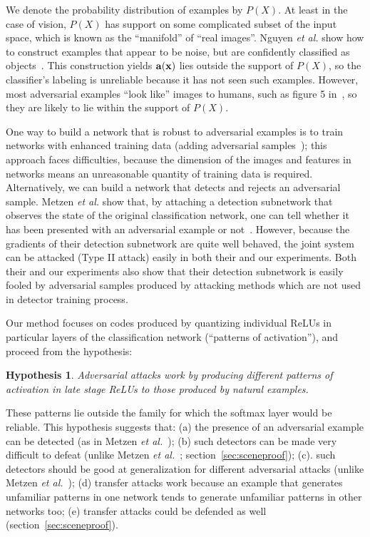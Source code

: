 \documentclass[10pt,twocolumn,letterpaper]{article}
\newtheorem{theorem}{Hypothesis}
\newcommand{\vect}[1]{{\bf {#1}}}
\begin{document}
We denote the probability distribution of examples by $P(X)$.  At least in the case of vision, $P(X)$ has support on
some complicated subset of the input space, which is known as 
the ``manifold'' of ``real images''.  Nguyen {\em et al.} show how to construct examples that appear to be noise, but
are confidently classified as objects~\cite{nguyenfooled}.  This construction yields $\vect{a}(\vect{x})$ lies outside
the support of $P(X)$, so the classifier's labeling is unreliable because it  has not  seen such examples.   However,
most adversarial examples ``look like'' images to humans, such as figure 5 in~\cite{szegedy2013intriguing}, so they are likely to
lie within the support of $P(X)$.  

One way to build a network that is robust to adversarial examples is to train networks with enhanced training data
(adding adversarial samples~\cite{miyato2015distributional}); this approach faces difficulties, because the dimension of
the images and features in networks means an unreasonable quantity of training data is required. 
Alternatively, we can build a network that detects and rejects an adversarial sample. 
 Metzen {\em et al.} show that, by attaching a detection subnetwork that observes the state of the original
 classification network, one can tell whether it has been presented with an 
adversarial example or not~\cite{metzen2017detecting}. However, because the gradients of their detection subnetwork
are quite well behaved, the joint system can be attacked (Type II attack) easily in both their and our experiments.  
Both their and our experiments also show that their detection subnetwork is easily fooled by adversarial samples produced 
by attacking methods which are not used in detector training process. 

Our method focuses on codes produced by quantizing individual
ReLUs in particular layers of the classification network (``patterns of activation''), and proceed from the hypothesis:
\begin{theorem}
Adversarial attacks work by producing different patterns of activation in late
stage ReLUs to those produced by natural examples.
\label{hyp}
\end{theorem}
These patterns lie outside the family for which the softmax layer would be reliable.
This hypothesis suggests that:  (a) the presence of an adversarial example can be
detected (as in Metzen {\em et al.}~\cite{metzen2017detecting}); (b) such detectors can be made
very difficult to defeat (unlike Metzen {\em et al.}~\cite{metzen2017detecting}; section~\ref{sec:sceneproof}); 
(c). such detectors should be good at generalization for different adversarial attacks 
(unlike Metzen {\em et al.}~\cite{metzen2017detecting}); 
(d) transfer attacks work because an example that generates unfamiliar patterns in one
network tends to generate unfamiliar patterns in other networks too; (e) transfer attacks could be defended as well (section~\ref{sec:sceneproof}).
\end{document}
